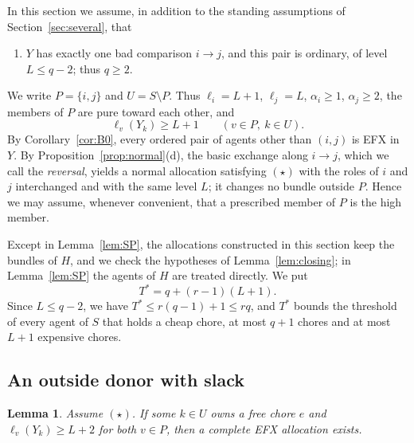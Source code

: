\documentclass{amsart}
\numberwithin{equation}{section}
\newtheorem{lemma}[theorem]{Lemma}
\theoremstyle{definition}
\theoremstyle{remark}
\begin{document}
In this section we assume, in addition to the standing assumptions of Section~\ref{sec:several}, that
\begin{enumerate}[label=$(\star)$,leftmargin=*]
\item $Y$ has exactly one bad comparison $i\to j$, and this pair is ordinary, of level $L\le q-2$; thus $q\ge2$.
\end{enumerate}
We write $P=\{i,j\}$ and $U=S\setminus P$. Thus $\ell_i=L+1$, $\ell_j=L$, $\alpha_i\ge1$, $\alpha_j\ge2$, the members of $P$ are pure toward each other, and
\begin{equation}\label{eq:margin}
\ell_v(Y_k)\ge L+1\qquad(v\in P,\ k\in U).
\end{equation}
By Corollary~\ref{cor:B0}, every ordered pair of agents other than $(i,j)$ is EFX in $Y$. By Proposition~\ref{prop:normal}(d), the basic exchange along $i\to j$, which we call the \emph{reversal}, yields a normal allocation satisfying $(\star)$ with the roles of $i$ and $j$ interchanged and with the same level $L$; it changes no bundle outside $P$. Hence we may assume, whenever convenient, that a prescribed member of $P$ is the high member.

Except in Lemma~\ref{lem:SP}, the allocations constructed in this section keep the bundles of $H$, and we check the hypotheses of Lemma~\ref{lem:closing}; in Lemma~\ref{lem:SP} the agents of $H$ are treated directly. We put
\[
T^*=q+(r-1)(L+1).
\]
Since $L\le q-2$, we have $T^*\le r(q-1)+1\le rq$, and $T^*$ bounds the threshold of every agent of $S$ that holds a cheap chore, at most $q+1$ chores and at most $L+1$ expensive chores.

\subsection{An outside donor with slack}

\begin{lemma}\label{lem:slack}
Assume $(\star)$. If some $k\in U$ owns a free chore $e$ and $\ell_v(Y_k)\ge L+2$ for both $v\in P$, then a complete EFX allocation exists.
\end{lemma}
\end{document}
